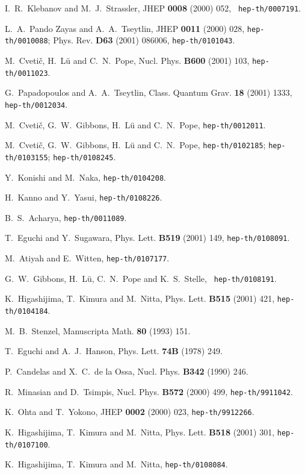 \documentclass[a4paper,11pt]{article}
\begin{document}
{\begin{thebibliography}{99}
I.~R.~Klebanov and M.~J.~Strassler, JHEP {\bf 0008} (2000) 052, {\tt
hep-th/0007191}.

L.~A.~Pando Zayas and A.~A.~Tseytlin, JHEP {\bf 0011} (2000) 028, 
{\tt hep-th/0010088};  
Phys. Rev. {\bf D63} 
(2001) 086006, {\tt hep-th/0101043}.

M.~Cveti\v{c}, H.~L\"{u} and C.~N.~Pope, Nucl. Phys. {\bf B600} (2001)
103, {\tt hep-th/0011023}.

G.~Papadopoulos and A.~A.~Tseytlin, Class. Quantum Grav. {\bf 18} (2001)
1333, {\tt hep-th/0012034}.

M.~Cveti\v{c}, G.~W.~Gibbons, H.~L\"u and C.~N.~Pope, 
{\tt hep-th/0012011}.

M.~Cveti\v{c}, G.~W.~Gibbons, H.~L\"u and C.~N.~Pope, 
{\tt hep-th/0102185}; {\tt hep-th/0103155}; {\tt hep-th/0108245}.

Y.~Konishi and M.~Naka, {\tt hep-th/0104208}.

H.~Kanno and Y.~Yasui, {\tt hep-th/0108226}. 

B.~S.~Acharya, {\tt hep-th/0011089}.

T.~Eguchi and Y.~Sugawara, Phys. Lett. {\bf B519} (2001) 149, 
{\tt hep-th/0108091}.

M.~Atiyah and E.~Witten, {\tt hep-th/0107177}.

G.~W.~Gibbons, H.~L\"{u}, C.~N.~Pope and K.~S.~Stelle, {\tt
hep-th/0108191}.

K.~Higashijima, T.~Kimura and M.~Nitta, Phys. Lett. 
{\bf B515} (2001) 421, 
{\tt hep-th/0104184}. 

M.~B.~Stenzel, Manuscripta Math. {\bf 80} (1993) 151.

T.~Eguchi and A.~J.~Hanson, Phys. Lett. {\bf 74B} (1978) 249. 

P.~Candelas and X.~C.~de la Ossa,
Nucl. Phys. {\bf B342} (1990) 246.

R.~Minasian and D.~Tsimpis, 
Nucl. Phys. {\bf B572} (2000) 499, {\tt hep-th/9911042}.

K.~Ohta and T.~Yokono, JHEP {\bf 0002} (2000) 023, 
{\tt hep-th/9912266}.

K.~Higashijima, T.~Kimura and M.~Nitta, 
Phys. Lett. {\bf B518} (2001) 301, 
{\tt hep-th/0107100}. 

K.~Higashijima, T.~Kimura and M.~Nitta, {\tt hep-th/0108084}.


\end{thebibliography}}
\end{document}
